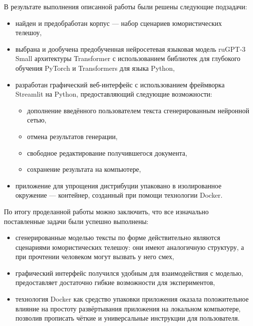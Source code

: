 \Conclusion
\label{cha:conclusion}

В результате выполнения описанной работы были решены следующие подзадачи:
\begin{itemize}
    \item найден и предобработан корпус --- набор сценариев юмористических телешоу,
    \item выбрана и дообучена предобученная нейросетевая языковая модель ruGPT-3 Small архитектуры Transformer с использованием библиотек для глубокого обучения PyTorch и Transformers для языка Python,
    \item разработан графический веб-интерфейс с использованием фреймворка Streamlit на Python, предоставляющий следующие возможности:
    \begin{itemize}
        \item дополнение введённого пользователем текста сгенерированным нейронной сетью,
        \item отмена результатов генерации,
        \item свободное редактирование получившегося документа,
        \item сохранение результата на компьютере,
    \end{itemize}
    \item приложение для упрощения дистрибуции упаковано в изолированное окружение --- контейнер, созданный при помощи технологии Docker.
\end{itemize}

По итогу проделанной работы можно заключить, что все изначально поставленные задачи были успешно выполнены:
\begin{itemize}
    \item сгенерированные моделью тексты по форме действительно являются сценариями юмористических телешоу: они имеют аналогичную структуру, а при прочтении человеком могут вызвать у него смех,
    \item графический интерфейс получился удобным для взаимодействия с моделью, предоставляет достаточно гибкие возможности для экспериментов,
    \item технология Docker как средство упаковки приложения оказала положительное влияние на простоту развёртывания приложения на локальном компьютере, позволив прописать чёткие и универсальные инструкции для пользователя.
\end{itemize}
